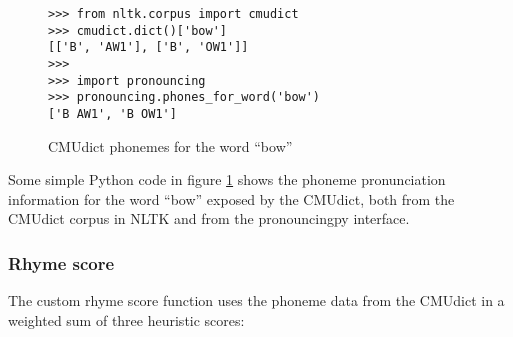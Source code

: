 \documentclass[11pt,a4paper]{article}
\begin{document}
\begin{figure}
\begin{Verbatim}[fontsize=\small]
>>> from nltk.corpus import cmudict
>>> cmudict.dict()['bow']
[['B', 'AW1'], ['B', 'OW1']]
>>>
>>> import pronouncing
>>> pronouncing.phones_for_word('bow')
['B AW1', 'B OW1']
\end{Verbatim}
\caption{CMUdict phonemes for the word ``bow''}
\label{fig:cmudict}
\end{figure}

Some simple Python code in figure \ref{fig:cmudict} shows the phoneme pronunciation information for the word ``bow'' exposed by the CMUdict, both from the CMUdict corpus in NLTK and from the pronouncingpy interface.

\subsubsection{Rhyme score}
\label{sec:rhymescore}
The custom rhyme score function uses the phoneme data from the CMUdict in a weighted sum of three heuristic scores:
\end{document}
